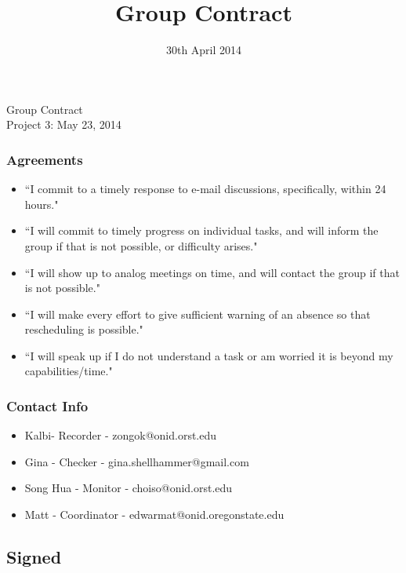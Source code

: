 \documentclass{article}
\title{Group Contract}
\date{30th April 2014}
\begin{document}


\begingroup
  \centering
  \LARGE Group Contract\\[1em]
  \large Project 3: May 23, 2014\par
\endgroup

\subsubsection*{Agreements}

\begin{itemize}
\item ``I commit to a timely response to e-mail discussions, specifically, within 24 hours."

\item``I will commit to timely progress on individual tasks, and will inform the group if that is not possible, or difficulty arises."

\item``I will show up to analog meetings on time, and will contact the group if that is not possible."

\item``I will make every effort to give sufficient warning of an absence so that rescheduling is possible."

\item``I will speak up if I do not understand a task or am worried it is beyond my capabilities/time."
\end{itemize}

\subsubsection*{Contact Info}

\begin{itemize}
\item[] Kalbi- Recorder -  zongok@onid.orst.edu 
\item[] Gina - Checker - gina.shellhammer@gmail.com 
\item[] Song Hua - Monitor - choiso@onid.orst.edu 
\item[] Matt - Coordinator - edwarmat@onid.oregonstate.edu 
\end{itemize}

\subsection*{Signed}
\end{document}
